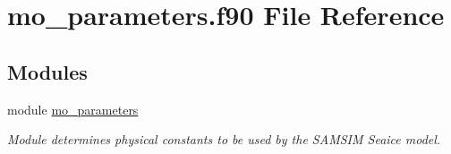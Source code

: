 \hypertarget{mo__parameters_8f90}{
\section{mo\_\-parameters.f90 File Reference}
\label{mo__parameters_8f90}
}
\subsection*{Modules}
\begin{DoxyCompactItemize}
\item 
module \hyperlink{namespacemo__parameters}{mo\_\-parameters}


\begin{DoxyCompactList}\small\item\em Module determines physical constants to be used by the SAMSIM Seaice model. \item\end{DoxyCompactList}

\end{DoxyCompactItemize}

